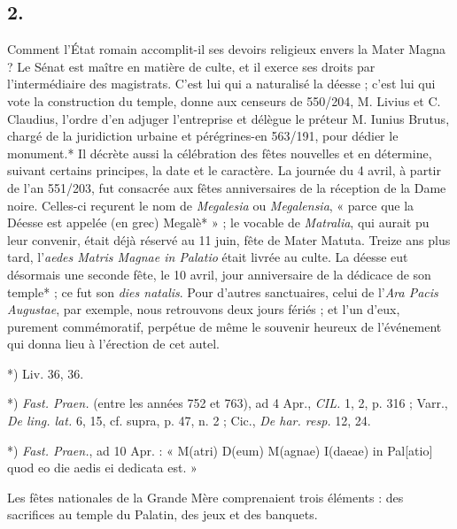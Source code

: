 \documentclass[a4paper, 11pt, oneside, polutonikogreek, french]{article}
\begin{document}
\subsection{2.}

Comment l'État romain accomplit-il ses devoirs religieux envers la Mater Magna ? Le Sénat est maître en matière de culte, et il exerce ses droits par l'intermédiaire des magistrats. C'est lui qui a naturalisé la déesse ; c'est lui qui vote la construction du temple, donne aux censeurs de 550/204, M. Livius et C. Claudius, l'ordre d'en adjuger l'entreprise et délègue le préteur M. Iunius Brutus, chargé de la juridiction urbaine et pérégrines-en 563/191, pour dédier le monument.* Il décrète aussi la célébration des fêtes nouvelles et en détermine, suivant certains principes, la date et le caractère. La journée du 4 avril, à partir de l'an 551/203, fut consacrée aux fêtes anniversaires de la réception de la Dame noire. Celles-ci reçurent le nom de \emph{Megalesia} ou \emph{Megalensia}, « parce que la Déesse est appelée (en grec) Megalè* » ; le vocable de \emph{Matralia}, qui aurait pu leur convenir, était déjà réservé au 11 juin, fête de Mater Matuta. Treize ans plus tard, l'\emph{aedes Matris Magnae in Palatio} était livrée au culte. La déesse eut désormais une seconde fête, le 10 avril, jour anniversaire de la dédicace de son temple* ; ce fut son \emph{dies natalis}. Pour d'autres sanctuaires, celui de l'\emph{Ara Pacis Augustae}, par exemple, nous retrouvons deux jours fériés ; et l'un d'eux, purement commémoratif, perpétue de même le souvenir heureux de l'événement qui donna lieu à l'érection de cet autel.

*) Liv. 36, 36.

*) \emph{Fast. Praen.} (entre les années 752 et 763), ad 4 Apr., \emph{CIL.} 1, 2, p. 316 ; Varr., \emph{De ling. lat.} 6, 15, cf. supra, p. 47, n. 2 ; Cic., \emph{De har. resp.} 12, 24.

*) \emph{Fast. Praen.}, ad 10 Apr. : « M(atri) D(eum) M(agnae) I(daeae) in Pal[atio] quod eo die aedis ei dedicata est. »

Les fêtes nationales de la Grande Mère comprenaient trois éléments : des sacrifices au temple du Palatin, des jeux et des banquets.
\end{document}
